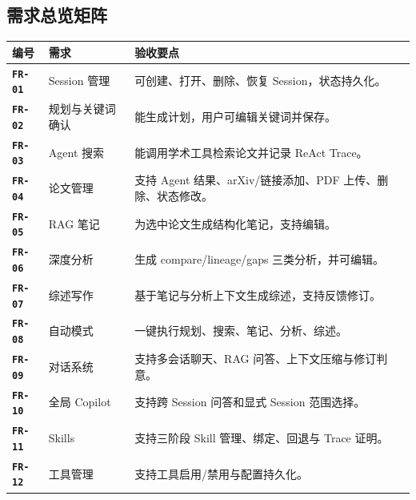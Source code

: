 \documentclass[12pt,a4paper,onecolumn]{ctexart}
\newcommand{\req}[1]{\textbf{\texttt{#1}}}
\begin{document}
\subsection{需求总览矩阵}
\begin{longtable}{p{2.2cm}p{5.1cm}p{6.1cm}}
\toprule
\textbf{编号} & \textbf{需求} & \textbf{验收要点} \\
\midrule
\req{FR-01} & Session 管理 & 可创建、打开、删除、恢复 Session，状态持久化。\\
\req{FR-02} & 规划与关键词确认 & 能生成计划，用户可编辑关键词并保存。\\
\req{FR-03} & Agent 搜索 & 能调用学术工具检索论文并记录 ReAct Trace。\\
\req{FR-04} & 论文管理 & 支持 Agent 结果、arXiv/链接添加、PDF 上传、删除、状态修改。\\
\req{FR-05} & RAG 笔记 & 为选中论文生成结构化笔记，支持编辑。\\
\req{FR-06} & 深度分析 & 生成 compare/lineage/gaps 三类分析，并可编辑。\\
\req{FR-07} & 综述写作 & 基于笔记与分析上下文生成综述，支持反馈修订。\\
\req{FR-08} & 自动模式 & 一键执行规划、搜索、笔记、分析、综述。\\
\req{FR-09} & 对话系统 & 支持多会话聊天、RAG 问答、上下文压缩与修订判意。\\
\req{FR-10} & 全局 Copilot & 支持跨 Session 问答和显式 Session 范围选择。\\
\req{FR-11} & Skills & 支持三阶段 Skill 管理、绑定、回退与 Trace 证明。\\
\req{FR-12} & 工具管理 & 支持工具启用/禁用与配置持久化。\\
\bottomrule
\end{longtable}
\end{document}
